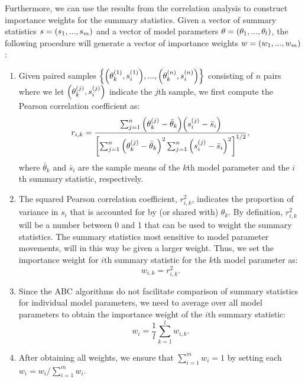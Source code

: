 Furthermore, we can use the results from the correlation analysis to construct importance weights for the summary statistics. Given a vector of summary statistics $s = \qty(s_1, ..., s_m)$ and a vector of model parameters $\theta = \qty(\theta_1, ..., \theta_l)$, the following procedure will generate a vector of importance weights $w = \qty(w_1, ..., w_m)$: 
\begin{enumerate}
    \item Given paired samples $\qty{\qty(\theta_k^{(1)}, s_i^{(1)}), ..., \qty(\theta_k^{(n)}, s_i^{(n)})}$ consisting of $n$ pairs where we let $\qty(\theta_k^{(j)}, s_i^{(j)})$ indicate the $j$th sample, we first compute the Pearson correlation coefficient as:
    \begin{equation*}
    r_{i, k} = \frac{\sum_{j=1}^n \qty(\theta_k^{(j)} - \bar{\theta}_k) \qty(s_i^{(j)} - \bar{s}_i)}{\qty[\sum_{j=1}^n \qty(\theta_k^{(j)} - \bar{\theta}_k )^2 \sum_{j=1}^n \qty(s_i^{(j)} - \bar{s}_i )^2 ]^{1/2}},
    \end{equation*}
    where $\bar{\theta}_k$ and $\bar{s}_i$ are the sample means of the $k$th model parameter and the $i$th summary statistic, respectively.
    \item The squared Pearson correlation coefficient, $r_{i,k}^2$, indicates the proportion of variance in $s_{i}$ that is accounted for by (or shared with) $\theta_k$. By definition, $r_{i,k}^2$ will be a number between 0 and 1 that can be used to weight the summary statistics. The summary statistics most sensitive to model parameter movements, will in this way be given a larger weight. Thus, we set the importance weight for $i$th summary statistic for the $k$th model parameter as:
    \begin{equation*}
        w_{i, k} = r_{i, k}^2.
    \end{equation*}
    \item Since the ABC algorithms do not facilitate comparison of summary statistics for individual model parameters, we need to average over all model parameters to obtain the importance weight of the $i$th summary statistic:
    \begin{equation*}
        w_i = \frac{1}{l} \sum_{k=1}^l w_{i, k}.
    \end{equation*}
    \item After obtaining all weights, we ensure that $\sum_{i=1}^m w_i = 1$ by setting each $w_i = w_i / \sum_{i=1}^m w_i$.
\end{enumerate} 




